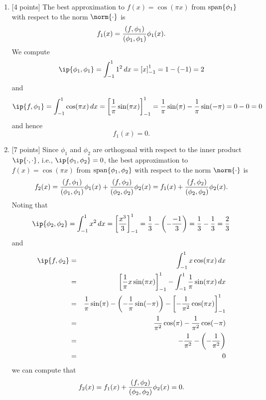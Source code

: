 \begin{solution}

\begin{enumerate}
\item {[4 points]} The best approximation to $f(x) = \cos(\pi x)$ from ${\rm span}\{\phi_1\}$ with respect to the norm $\norm{\cdot}$ is
       \[ f_1(x) = {(f,\phi_1) \over (\phi_1, \phi_1)} \phi_1(x).\]
      We compute
\[
          \ip{\phi_1,\phi_1} = \int_{-1}^1 1^2\,dx = \left[x\right]_{-1}^1=1-\left(-1\right)=2
\]
and
\[
          \ip{f,\phi_1} = \int_{-1}^1 \cos(\pi x)\,dx = \left[\frac{1}{\pi}\sin(\pi x)\right]_{-1}^1=\frac{1}{\pi}\sin(\pi)-\frac{1}{\pi}\sin(-\pi)=0-0=0
\]
      and hence
       \[ f_1(x) = 0.\]
\item {[7 points]} Since $\phi_1$ and $\phi_2$ are
      orthogonal with respect to the inner product $\ip{\cdot,\cdot}$, i.e., $\ip{\phi_1, \phi_2} = 0$, the best approximation to $f(x) = \cos(\pi x)$ from ${\rm span}\{\phi_1,\phi_2\}$ with respect to the norm $\norm{\cdot}$ is
       \[ f_2(x) = {(f,\phi_1) \over (\phi_1, \phi_1)} \phi_1(x) + {(f,\phi_2) \over (\phi_2, \phi_2)} \phi_2(x) = f_1(x) + {(f,\phi_2) \over (\phi_2, \phi_2)} \phi_2(x).\]
      Noting that
      \[
         \ip{\phi_2,\phi_2} =\int_{-1}^1 x^2\,dx = \left[{x^3\over 3}\right]_{-1}^1 = {1 \over 3} - \left(-{-1 \over 3}\right) = {1 \over 3} - {1 \over 3} = {2\over 3}
\]
and
\begin{eqnarray*}
\ip{f,\phi_2} &=&\int_{-1}^1 x\cos(\pi x)\,dx 
\\
&=&\left[\frac{1}{\pi}x\sin(\pi x)\right]_{-1}^1-\int_{-1}^1 \frac{1}{\pi}\sin(\pi x)\,dx 
\\
&=& \frac{1}{\pi}\sin(\pi)-\left(-\frac{1}{\pi}\sin(-\pi)\right)-\left[-\frac{1}{\pi^2}\cos(\pi x)\right]_{-1}^1 
\\
&=& \frac{1}{\pi^2}\cos(\pi)-\frac{1}{\pi^2}\cos(-\pi)
\\
&=&-\frac{1}{\pi^2}-\left(-\frac{1}{\pi^2}\right)
\\
&=&0
\end{eqnarray*}
      we can compute that
       \[ f_2(x) = f_1(x)
                  + {(f,\phi_2) \over (\phi_2, \phi_2)} \phi_2(x) = 0.\]
  


\end{enumerate}
\end{solution}
